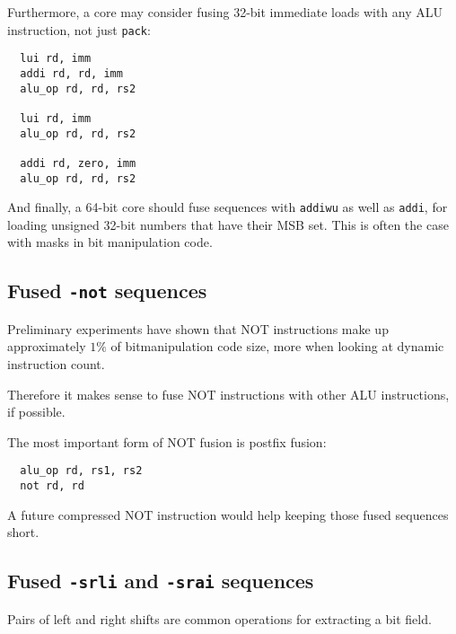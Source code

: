 Furthermore, a core may consider fusing 32-bit immediate loads with any ALU
instruction, not just {\tt pack}:

\begin{minipage}{\linewidth}
\begin{verbatim}
  lui rd, imm
  addi rd, rd, imm
  alu_op rd, rd, rs2

  lui rd, imm
  alu_op rd, rd, rs2

  addi rd, zero, imm
  alu_op rd, rd, rs2
\end{verbatim}
\end{minipage}

And finally, a 64-bit core should fuse sequences with {\tt addiwu} as well as
{\tt addi}, for loading unsigned 32-bit numbers that have their MSB set. This is
often the case with masks in bit manipulation code.


\subsection{Fused {\tt *-not} sequences}

Preliminary experiments have shown that NOT instructions make up approximately
$1\%$ of bitmanipulation code size, more when looking at dynamic instruction count.~\cite{Wolf17A}

Therefore it makes sense to fuse NOT instructions with other ALU instructions, if possible.

The most important form of NOT fusion is postfix fusion:

\begin{minipage}{\linewidth}
\begin{verbatim}
  alu_op rd, rs1, rs2
  not rd, rd
\end{verbatim}
\end{minipage}

A future compressed NOT instruction would help keeping those fused sequences short.


\subsection{Fused {\tt *-srli} and {\tt *-srai} sequences}

Pairs of left and right shifts are common operations for extracting a bit field.

